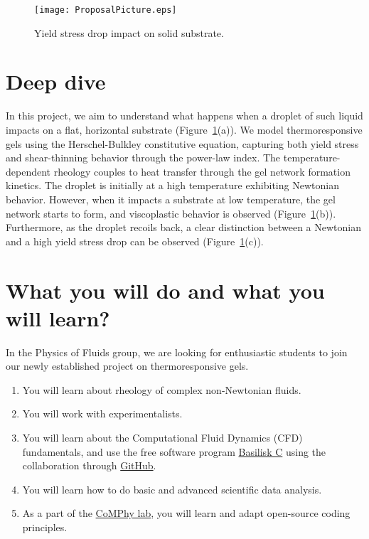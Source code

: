 \documentclass[a4paper,10pt]{article}
\begin{document}
\begin{figure}[H]
	\begin{center}
	 \texttt{[image: ProposalPicture.eps]}
	\end{center}
	\caption{Yield stress drop impact on solid substrate.}
	\label{Fig::Fig1}
 \end{figure}

\section*{Deep dive}
In this project, we aim to understand what happens when a droplet of such liquid impacts on a flat, horizontal substrate (Figure~\ref{Fig::Fig1}(a)). We model thermoresponsive gels using the Herschel-Bulkley constitutive equation, capturing both yield stress and shear-thinning behavior through the power-law index. The temperature-dependent rheology couples to heat transfer through the gel network formation kinetics. The droplet is initially at a high temperature exhibiting Newtonian behavior. However, when it impacts a substrate at low temperature, the gel network starts to form, and viscoplastic behavior is observed (Figure~\ref{Fig::Fig1}(b)). Furthermore, as the droplet recoils back, a clear distinction between a Newtonian and a high yield stress drop can be observed (Figure~\ref{Fig::Fig1}(c)). 

\section*{What you will do and what you will learn?}
In the Physics of Fluids group, we are looking for enthusiastic students to join our newly established project on thermoresponsive gels. 

\begin{enumerate}
	\item You will learn about rheology of complex non-Newtonian fluids. 
	\item You will work with experimentalists.
	\item You will learn about the Computational Fluid Dynamics (CFD) fundamentals, and use the free software program \href{http://basilisk.fr}{Basilisk C} using the collaboration through \href{https://github.com/comphy-lab/VP-DropImpact}{GitHub}.
	\item You will learn how to do basic and advanced scientific data analysis. 
	\item As a part of the \href{https://comphy-lab.org}{CoMPhy lab}, you will learn and adapt open-source coding principles. 
\end{enumerate}
\end{document}
